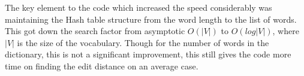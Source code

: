 \documentclass[a4paper,10pt]{article}
\begin{document}
The key element to the code which increased the speed considerably was maintaining the Hash table structure from the word length to the list of words.
This got down the search factor from asymptotic $O(|V|)$ to $O(log |V|)$, where $|V|$ is the size of the vocabulary. Though for the number of words in 
the dictionary, this is not a significant improvement, this still gives the code more time on finding the edit distance on an average case.
  
\end{document}
